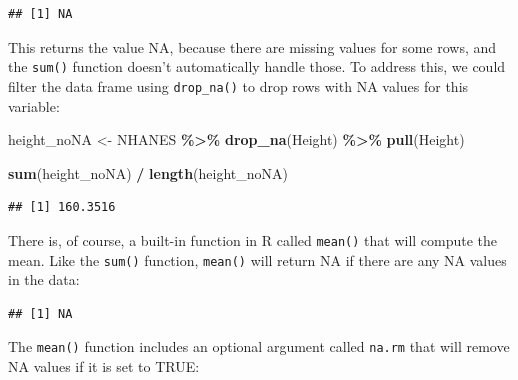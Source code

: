 \documentclass[
  12pt,
]{book}
\newenvironment{Shaded}{\begin{snugshade}}{\end{snugshade}}
\newcommand{\AttributeTok}[1]{\textcolor[rgb]{0.13,0.29,0.53}{#1}}
\newcommand{\ConstantTok}[1]{\textcolor[rgb]{0.56,0.35,0.01}{#1}}
\newcommand{\FunctionTok}[1]{\textcolor[rgb]{0.13,0.29,0.53}{\textbf{#1}}}
\newcommand{\NormalTok}[1]{#1}
\newcommand{\OtherTok}[1]{\textcolor[rgb]{0.56,0.35,0.01}{#1}}
\newcommand{\SpecialCharTok}[1]{\textcolor[rgb]{0.81,0.36,0.00}{\textbf{#1}}}
\begin{document}
\begin{verbatim}
## [1] NA
\end{verbatim}

This returns the value NA, because there are missing values for some rows, and the \texttt{sum()} function doesn't automatically handle those. To address this, we could filter the data frame using \texttt{drop\_na()} to drop rows with NA values for this variable:

\begin{Shaded}
\begin{Highlighting}[]
\NormalTok{height\_noNA }\OtherTok{\textless{}{-}}\NormalTok{ NHANES }\SpecialCharTok{\%\textgreater{}\%}
  \FunctionTok{drop\_na}\NormalTok{(Height) }\SpecialCharTok{\%\textgreater{}\%}
  \FunctionTok{pull}\NormalTok{(Height)}

\FunctionTok{sum}\NormalTok{(height\_noNA) }\SpecialCharTok{/} \FunctionTok{length}\NormalTok{(height\_noNA)}
\end{Highlighting}
\end{Shaded}

\begin{verbatim}
## [1] 160.3516
\end{verbatim}

There is, of course, a built-in function in R called \texttt{mean()} that will compute the mean. Like the \texttt{sum()} function, \texttt{mean()} will return NA if there are any NA values in the data:

\begin{Shaded}
\end{Shaded}

\begin{verbatim}
## [1] NA
\end{verbatim}

The \texttt{mean()} function includes an optional argument called \texttt{na.rm} that will remove NA values if it is set to TRUE:

\begin{Shaded}
\end{Shaded}
\end{document}
